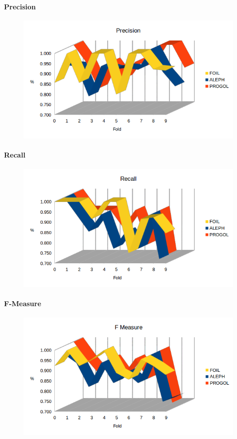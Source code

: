 \paragraph{Precision}
\begin{figure}[H]
	\includegraphics[width=1.1\textwidth]{img/datasetGraph/mlj/discr/precision.png}
	\label{mljdiscr-Precision}
\end{figure}
\paragraph{Recall}
\begin{figure}[H]
	\includegraphics[width=1.1\textwidth]{img/datasetGraph/mlj/discr/recall.png}
	\label{mljdiscr-Recall}
\end{figure}
\paragraph{F-Measure}
\begin{figure}[H]
	\includegraphics[width=1.1\textwidth]{img/datasetGraph/mlj/discr/fm.png}
	\label{mljdiscr-F-measure}
\end{figure}

